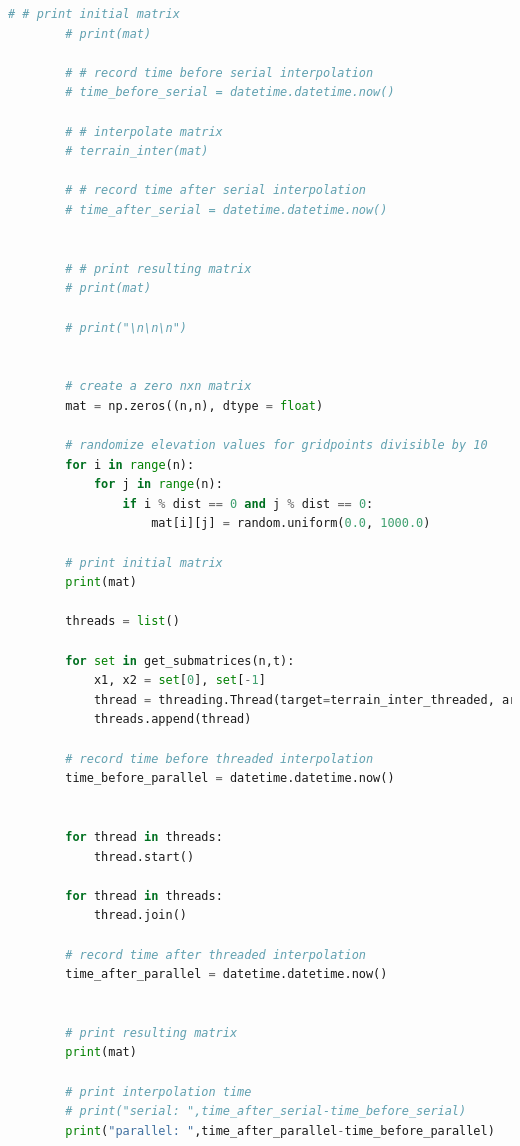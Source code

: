 \documentclass{article}
\begin{document}
\begin{lstlisting}[language=Python]
        # # print initial matrix
        # print(mat)
    
        # # record time before serial interpolation
        # time_before_serial = datetime.datetime.now()
    
        # # interpolate matrix
        # terrain_inter(mat)
    
        # # record time after serial interpolation
        # time_after_serial = datetime.datetime.now()
    
    
        # # print resulting matrix
        # print(mat)
    
        # print("\n\n\n")
    
    
        # create a zero nxn matrix
        mat = np.zeros((n,n), dtype = float)
    
        # randomize elevation values for gridpoints divisible by 10
        for i in range(n):
            for j in range(n):
                if i % dist == 0 and j % dist == 0:
                    mat[i][j] = random.uniform(0.0, 1000.0)
    
        # print initial matrix
        print(mat)
    
        threads = list()
    
        for set in get_submatrices(n,t):
            x1, x2 = set[0], set[-1]
            thread = threading.Thread(target=terrain_inter_threaded, args=(mat,x1,x2))
            threads.append(thread)
    
        # record time before threaded interpolation
        time_before_parallel = datetime.datetime.now()
    
    
        for thread in threads:
            thread.start()
    
        for thread in threads:
            thread.join()
    
        # record time after threaded interpolation
        time_after_parallel = datetime.datetime.now()
    
    
        # print resulting matrix
        print(mat)
    
        # print interpolation time
        # print("serial: ",time_after_serial-time_before_serial)
        print("parallel: ",time_after_parallel-time_before_parallel)
\end{lstlisting}
\end{document}
